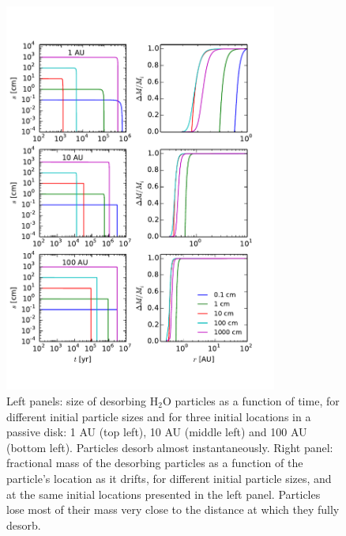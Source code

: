 \documentclass[apj]{emulateapj}
\begin{document}
\begin{figure}[t!]
\centering
\includegraphics[width=0.8\textwidth]{../../figs/s_t_a.pdf}
\caption{Left panels: size of desorbing H$_2$O particles as a function of time, for different initial particle sizes and for three initial locations in a passive disk: 1 AU (top left), 10 AU (middle left) and 100 AU (bottom left). Particles desorb almost instantaneously. Right panel: fractional mass of the desorbing particles as a function of the particle's location as it drifts, for different initial particle sizes, and at the same initial locations presented in the left panel. Particles lose most of their mass very close to the distance at which they fully desorb.}
\label{fig:s_t_a}
\end{figure}
\end{document}
